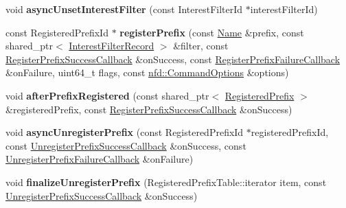 \begin{DoxyCompactItemize}
\item 
void {\bfseries async\+Unset\+Interest\+Filter} (const Interest\+Filter\+Id $\ast$interest\+Filter\+Id)\hypertarget{classndn_1_1Face_1_1Impl_a2256531aa2439ac416ae2c4d01c25bdf}{}\label{classndn_1_1Face_1_1Impl_a2256531aa2439ac416ae2c4d01c25bdf}

\item 
const Registered\+Prefix\+Id $\ast$ {\bfseries register\+Prefix} (const \hyperlink{classndn_1_1Name}{Name} \&prefix, const shared\+\_\+ptr$<$ \hyperlink{classndn_1_1InterestFilterRecord}{Interest\+Filter\+Record} $>$ \&filter, const \hyperlink{namespacendn_a80b158f94737f73bec3f9af27161e899}{Register\+Prefix\+Success\+Callback} \&on\+Success, const \hyperlink{namespacendn_a691d213d0f708593217feeae517f3e45}{Register\+Prefix\+Failure\+Callback} \&on\+Failure, uint64\+\_\+t flags, const \hyperlink{classndn_1_1nfd_1_1CommandOptions}{nfd\+::\+Command\+Options} \&options)\hypertarget{classndn_1_1Face_1_1Impl_a7cdda63bb773046c1d854a08f5555cac}{}\label{classndn_1_1Face_1_1Impl_a7cdda63bb773046c1d854a08f5555cac}

\item 
void {\bfseries after\+Prefix\+Registered} (const shared\+\_\+ptr$<$ \hyperlink{classndn_1_1RegisteredPrefix}{Registered\+Prefix} $>$ \&registered\+Prefix, const \hyperlink{namespacendn_a80b158f94737f73bec3f9af27161e899}{Register\+Prefix\+Success\+Callback} \&on\+Success)\hypertarget{classndn_1_1Face_1_1Impl_aa6850671256538e4cb8c411a2e73aa82}{}\label{classndn_1_1Face_1_1Impl_aa6850671256538e4cb8c411a2e73aa82}

\item 
void {\bfseries async\+Unregister\+Prefix} (const Registered\+Prefix\+Id $\ast$registered\+Prefix\+Id, const \hyperlink{namespacendn_a6781fc026448072c22454e6af8b946e0}{Unregister\+Prefix\+Success\+Callback} \&on\+Success, const \hyperlink{namespacendn_a1d6036d735c4c3504dad4f56ed174e5d}{Unregister\+Prefix\+Failure\+Callback} \&on\+Failure)\hypertarget{classndn_1_1Face_1_1Impl_ae997a15dc9be4cc3317f9abce41ed6a8}{}\label{classndn_1_1Face_1_1Impl_ae997a15dc9be4cc3317f9abce41ed6a8}

\item 
void {\bfseries finalize\+Unregister\+Prefix} (Registered\+Prefix\+Table\+::iterator item, const \hyperlink{namespacendn_a6781fc026448072c22454e6af8b946e0}{Unregister\+Prefix\+Success\+Callback} \&on\+Success)\hypertarget{classndn_1_1Face_1_1Impl_a1e01d059d7e2d42cf187784c34fd8e4e}{}\label{classndn_1_1Face_1_1Impl_a1e01d059d7e2d42cf187784c34fd8e4e}

\end{DoxyCompactItemize}
